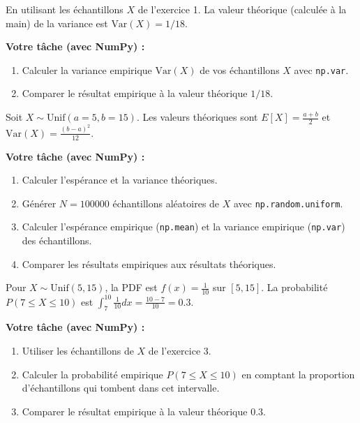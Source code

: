 \begin{exercicebox}
En utilisant les échantillons $X$ de l'exercice 1.
La valeur théorique (calculée à la main) de la variance est $\text{Var}(X) = 1/18$.

\textbf{Votre tâche (avec NumPy) :}
\begin{enumerate}
    \item Calculer la variance empirique $\text{Var}(X)$ de vos échantillons $X$ avec \texttt{np.var}.
    \item Comparer le résultat empirique à la valeur théorique $1/18$.
\end{enumerate}
\end{exercicebox}

\begin{exercicebox}
Soit $X \sim \text{Unif}(a=5, b=15)$. Les valeurs théoriques sont $E[X] = \frac{a+b}{2}$ et $\text{Var}(X) = \frac{(b-a)^2}{12}$.

\textbf{Votre tâche (avec NumPy) :}
\begin{enumerate}
    \item Calculer l'espérance et la variance théoriques.
    \item Générer $N=100000$ échantillons aléatoires de $X$ avec \texttt{np.random.uniform}.
    \item Calculer l'espérance empirique (\texttt{np.mean}) et la variance empirique (\texttt{np.var}) des échantillons.
    \item Comparer les résultats empiriques aux résultats théoriques.
\end{enumerate}
\end{exercicebox}

\begin{exercicebox}
Pour $X \sim \text{Unif}(5, 15)$, la PDF est $f(x) = \frac{1}{10}$ sur $[5, 15]$.
La probabilité $P(7 \le X \le 10)$ est $\int_7^{10} \frac{1}{10} dx = \frac{10-7}{10} = 0.3$.

\textbf{Votre tâche (avec NumPy) :}
\begin{enumerate}
    \item Utiliser les échantillons de $X$ de l'exercice 3.
    \item Calculer la probabilité empirique $P(7 \le X \le 10)$ en comptant la proportion d'échantillons qui tombent dans cet intervalle.
    \item Comparer le résultat empirique à la valeur théorique $0.3$.
\end{enumerate}
\end{exercicebox}

